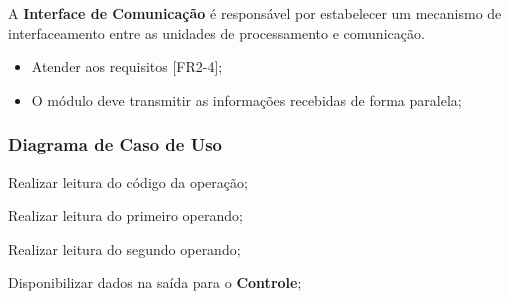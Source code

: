 \documentclass{article}
\begin{document}
  A \textbf{Interface de Comunicação} é responsável por estabelecer um mecanismo de interfaceamento entre as unidades de processamento e comunicação.
  
  \actors
    \begin{description}
    \end{description}
  
  \preconditions 
    \begin{itemize}
     \item Atender aos requisitos [FR2-4];
    \end{itemize}

  \postconditions
    \begin{itemize}
     \item O módulo deve transmitir as informações recebidas de forma paralela;
    \end{itemize}
  
  \newpage
  \subsubsection*{Diagrama de Caso de Uso}
  
  \begin{mainflow}
    \item Realizar leitura do código da operação;
    \item Realizar leitura do primeiro operando;
    \item Realizar leitura do segundo operando;
    \item Disponibilizar dados na saída para o \textbf{Controle};
  \end{mainflow}
  
% 
% 
\end{document}
